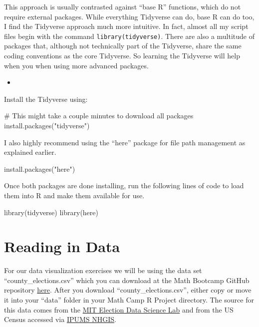 \documentclass[
  letterpaper,
]{book}
\newenvironment{Shaded}{\begin{snugshade}}{\end{snugshade}}
\newcommand{\CommentTok}[1]{\textcolor[rgb]{0.37,0.37,0.37}{#1}}
\newcommand{\FunctionTok}[1]{\textcolor[rgb]{0.28,0.35,0.67}{#1}}
\newcommand{\NormalTok}[1]{\textcolor[rgb]{0.00,0.23,0.31}{#1}}
\newcommand{\StringTok}[1]{\textcolor[rgb]{0.13,0.47,0.30}{#1}}
\providecommand{\tightlist}{%
  \setlength{\itemsep}{0pt}\setlength{\parskip}{0pt}}\usepackage{longtable,booktabs,array}
\theoremstyle{definition}
\theoremstyle{definition}
\theoremstyle{plain}
\theoremstyle{definition}
\theoremstyle{plain}
\theoremstyle{plain}
\theoremstyle{remark}
\begin{document}
This approach is usually contrasted against ``base R'' functions, which
do not require external packages. While everything Tidyverse can do,
base R can do too, I find the Tidyverse approach much more intuitive. In
fact, almost all my script files begin with the command
\texttt{library(tidyverse)}. There are also a multitude of packages
that, although not technically part of the Tidyverse, share the same
coding conventions as the core Tidyverse. So learning the Tidyverse will
help when you when using more advanced packages.

\begin{itemize}
\tightlist
\item
\end{itemize}

Install the Tidyverse using:

\begin{Shaded}
\begin{Highlighting}[]
\CommentTok{\# This might take a couple minutes to download all packages}
\FunctionTok{install.packages}\NormalTok{(}\StringTok{"tidyverse"}\NormalTok{)}
\end{Highlighting}
\end{Shaded}

I also highly recommend using the ``here'' package for file path
management as explained earlier.

\begin{Shaded}
\begin{Highlighting}[]
\FunctionTok{install.packages}\NormalTok{(}\StringTok{"here"}\NormalTok{)}
\end{Highlighting}
\end{Shaded}

Once both packages are done installing, run the following lines of code
to load them into R and make them available for use.

\begin{Shaded}
\begin{Highlighting}[]
\FunctionTok{library}\NormalTok{(tidyverse)}
\FunctionTok{library}\NormalTok{(here)}
\end{Highlighting}
\end{Shaded}

\hypertarget{reading-in-data}{%
\section{Reading in Data}\label{reading-in-data}}

For our data visualization exercises we will be using the data set
``county\_elections.csv'' which you can download at the Math Bootcamp
GitHub repository
\href{https://github.com/UCSDPoliMathCamp/MathCamp/tree/main/data}{here}.
After you download ``county\_elections.csv'', either copy or move it
into your ``data'' folder in your Math Camp R Project directory. The
source for this data comes from the
\href{https://electionlab.mit.edu/data}{MIT Election Data Science Lab}
and from the US Census accessed via \href{https://www.nhgis.org/}{IPUMS
NHGIS}.
\end{document}
